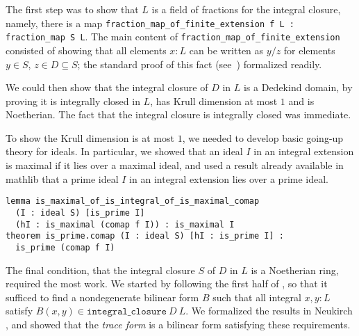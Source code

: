 \documentclass[a4paper,USenglish,cleveref, autoref, thm-restate]{lipics-v2021}
\newcommand{\lean}[1]{\texttt{#1}\xspace} %
\newcommand{\mathlib}{\textsf{mathlib}\xspace}
\begin{document}
The first step was to show that $L$ is a field of fractions for the integral closure, namely, there is a map \lean{fraction\_map\_of\_finite\_extension f L : fraction\_map S L}.
The main content of \lean{fraction\_map\_of\_finite\_extension} consisted of showing that all elements $x : L$ can be written as $y / z$ for elements $y \in S$, $z \in D \subseteq S$;
the standard proof of this fact (see~\cite[Theorem~15.29]{Dummit-and-Foote}) formalized readily.

We could then show that the integral closure of $D$ in $L$ is a Dedekind domain,
by proving it is integrally closed in $L$, has Krull dimension at most $1$ and is Noetherian.
The fact that the integral closure is integrally closed was immediate.

To show the Krull dimension is at most $1$, we needed to develop basic going-up theory for ideals.
In particular, we showed that an ideal $I$ in an integral extension is maximal if it lies over a maximal ideal,
and used a result already available in \mathlib that a prime ideal $I$ in an integral extension lies over a prime ideal.
\begin{lstlisting}
lemma is_maximal_of_is_integral_of_is_maximal_comap
  (I : ideal S) [is_prime I]
  (hI : is_maximal (comap f I)) : is_maximal I
theorem is_prime.comap (I : ideal S) [hI : is_prime I] :
  is_prime (comap f I)
\end{lstlisting}

The final condition, that the integral closure $S$ of $D$ in $L$ is a Noetherian ring, required the most work.
We started by following the first half of \cite[Theorem~15.29]{Dummit-and-Foote},
so that it sufficed to find a nondegenerate bilinear form $B$ such that all integral $x, y : L$ satisfy $B(x, y) \in \lean{integral\_closure}\ D\ L$.
We formalized the results in Neukirch \cite[\S\S~2.5--2.8]{Neukirch}, and showed that the \emph{trace form} is a bilinear form satisfying these requirements.
\end{document}
